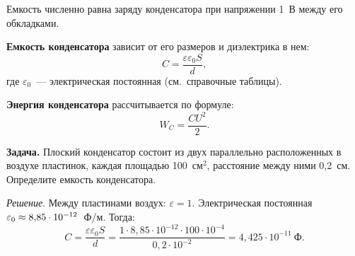 \documentclass[main.tex]{subfiles}
\begin{document}
\begin{NoHyper}
Емкость численно равна заряду конденсатора при напряжении 1~В между его обкладками. 

\textbf{Емкость конденсатора} зависит от его размеров и диэлектрика в нем:
\begin{equation}
    C=\frac{\varepsilon\varepsilon_0S}{d},
\end{equation}
где $\varepsilon_0$~--- электрическая постоянная (см.~справочные таблицы).

\textbf{Энергия конденсатора} рассчитывается по формуле:
\begin{equation}
    W_C=\frac{CU^2}{2}.
\end{equation}


\noindent\textbf{Задача.} Плоский конденсатор состоит из двух параллельно расположенных в воздухе пластинок, каждая площадью 100~см$^2$, расстояние между ними 0,2~см. Определите емкость конденсатора.

\smallskip

\noindent\emph{Решение}. Между пластинами воздух: $\varepsilon=1$. Электрическая постоянная $\varepsilon_0\hm\approx8{,}85\cdot10^{-12}$~Ф/м. Тогда:
\begin{equation*}
    C=\frac{\varepsilon\varepsilon_0S}{d}=\frac{1\cdot8{,}85\cdot10^{-12}\cdot100\cdot10^{-4}}{0{,}2\cdot10^{-2}}=4{,}425\cdot10^{-11}~\text{Ф}.
\end{equation*}














\end{NoHyper}
\end{document}
